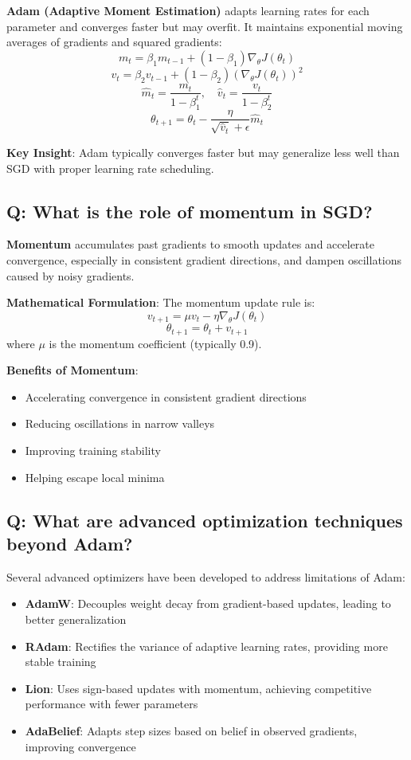 \textbf{Adam (Adaptive Moment Estimation)} adapts learning rates for each parameter and converges faster but may overfit. It maintains exponential moving averages of gradients and squared gradients:
\[
m_t = \beta_1 m_{t-1} + (1-\beta_1) \nabla_\theta J(\theta_t)
\]
\[
v_t = \beta_2 v_{t-1} + (1-\beta_2) (\nabla_\theta J(\theta_t))^2
\]
\[
\hat{m}_t = \frac{m_t}{1-\beta_1^t}, \quad \hat{v}_t = \frac{v_t}{1-\beta_2^t}
\]
\[
\theta_{t+1} = \theta_t - \frac{\eta}{\sqrt{\hat{v}_t} + \epsilon} \hat{m}_t
\]

\textbf{Key Insight}: Adam typically converges faster but may generalize less well than SGD with proper learning rate scheduling.

\subsection*{\textcolor{primaryteal}{Q: What is the role of momentum in SGD?}}
\textbf{Momentum} accumulates past gradients to smooth updates and accelerate convergence, especially in consistent gradient directions, and dampen oscillations caused by noisy gradients.

\textbf{Mathematical Formulation}: The momentum update rule is:
\[
v_{t+1} = \mu v_t - \eta \nabla_\theta J(\theta_t)
\]
\[
\theta_{t+1} = \theta_t + v_{t+1}
\]
where $\mu$ is the momentum coefficient (typically 0.9).

\textbf{Benefits of Momentum}:
\begin{itemize}
	\item Accelerating convergence in consistent gradient directions
	\item Reducing oscillations in narrow valleys
	\item Improving training stability
	\item Helping escape local minima
\end{itemize}

\subsection*{\textcolor{primaryteal}{Q: What are advanced optimization techniques beyond Adam?}}
Several advanced optimizers have been developed to address limitations of Adam:

\begin{itemize}
	\item \textbf{AdamW}: Decouples weight decay from gradient-based updates, leading to better generalization
	\item \textbf{RAdam}: Rectifies the variance of adaptive learning rates, providing more stable training
	\item \textbf{Lion}: Uses sign-based updates with momentum, achieving competitive performance with fewer parameters
	\item \textbf{AdaBelief}: Adapts step sizes based on belief in observed gradients, improving convergence
\end{itemize}

